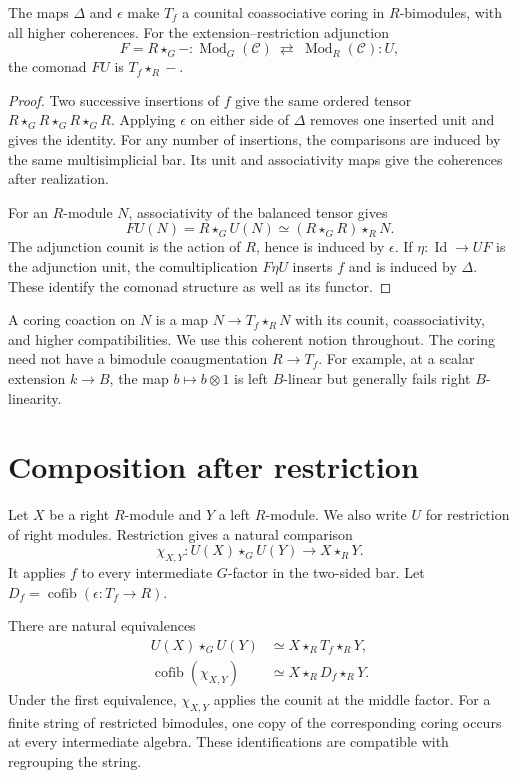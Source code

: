 \begin{proposition}\label{v4-prop:seam-coring}
The maps \(\Delta\) and \(\epsilon\) make \(T_f\) a counital
coassociative coring in \(R\)-bimodules, with all higher coherences.
For the extension--restriction adjunction
\[
 F=R\star_G-:\operatorname{Mod}_G(\mathcal C)
 \ \rightleftarrows\
 \operatorname{Mod}_R(\mathcal C):U,
\]
the comonad \(FU\) is \(T_f\star_R-\).
\end{proposition}

\begin{proof}
Two successive insertions of \(f\) give the same ordered tensor
\(R\star_G R\star_G R\star_G R\). Applying \(\epsilon\) on either
side of \(\Delta\) removes one inserted unit and gives the identity.
For any number of insertions, the comparisons are induced by the same
multisimplicial bar. Its unit and associativity maps give the coherences
after realization.

For an \(R\)-module \(N\), associativity of the balanced tensor gives
\[
 FU(N)=R\star_G U(N)
 \simeq (R\star_G R)\star_R N.
\]
The adjunction counit is the action of \(R\), hence is induced by
\(\epsilon\). If \(\eta:\operatorname{Id}\to UF\) is the adjunction
unit, the comultiplication \(F\eta U\) inserts \(f\) and is induced by
\(\Delta\). These identify the comonad structure as well as its functor.
\end{proof}

A coring coaction on \(N\) is a map
\(N\to T_f\star_R N\) with its counit, coassociativity, and higher
compatibilities. We use this coherent notion throughout.
The coring need not have a bimodule coaugmentation
\(R\to T_f\). For example, at a scalar extension \(k\to B\), the
map \(b\mapsto b\otimes1\) is left \(B\)-linear but generally fails
right \(B\)-linearity.

\section{Composition after restriction}
\label{v4-sec:restricted-composition}

Let \(X\) be a right \(R\)-module and \(Y\) a left \(R\)-module.
We also write \(U\) for restriction of right modules.
Restriction gives a natural comparison
\[
 \chi_{X,Y}:U(X)\star_G U(Y)\longrightarrow X\star_R Y.
\]
It applies \(f\) to every intermediate \(G\)-factor in the two-sided bar.
Let \(D_f=\operatorname{cofib}(\epsilon:T_f\to R)\).

\begin{theorem}
\label{v4-thm:seam-composition}
There are natural equivalences
\begin{align}
 U(X)\star_G U(Y)
 &\simeq X\star_R T_f\star_R Y,
 \label{v4-eq:seam-composition}\\
 \operatorname{cofib}(\chi_{X,Y})
 &\simeq X\star_R D_f\star_R Y.
 \label{v4-eq:seam-defect}
\end{align}
Under the first equivalence, \(\chi_{X,Y}\) applies the counit at the
middle factor. For a finite string of restricted bimodules, one copy
of the corresponding coring occurs at every intermediate algebra.
These identifications are compatible with regrouping the string.
\end{theorem}

